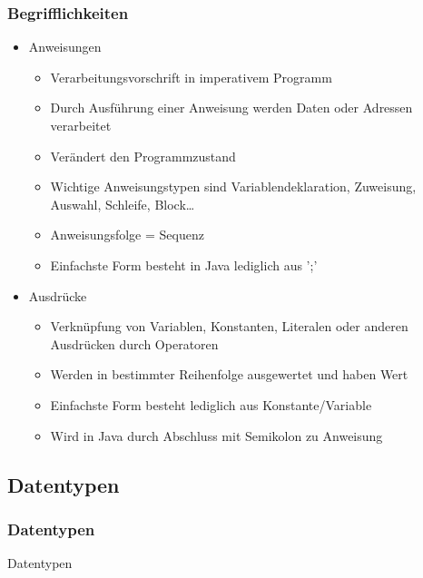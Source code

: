 \begin{frame}[fragile]
	\frametitle{Begrifflichkeiten}
	\begin{itemize}
	 \item Anweisungen
	  	\begin{itemize}
			\item Verarbeitungsvorschrift in imperativem Programm
			\item Durch Ausführung einer Anweisung werden Daten oder Adressen verarbeitet
			\item Verändert den Programmzustand
			\item Wichtige Anweisungstypen sind Variablendeklaration, Zuweisung,
			Auswahl, Schleife, Block\ldots
			\item Anweisungsfolge = Sequenz
			\item Einfachste Form besteht in Java lediglich aus ';'
	    \end{itemize}
	  \item Ausdrücke
	  	\begin{itemize}
			\item Verknüpfung von Variablen, Konstanten, Literalen oder anderen
			Ausdrücken durch Operatoren
			\item Werden in bestimmter Reihenfolge ausgewertet und haben Wert
			\item Einfachste Form besteht lediglich aus Konstante/Variable
			\item Wird in Java durch Abschluss mit Semikolon zu Anweisung 
	    \end{itemize}
	 \end{itemize}
\end{frame}

\subsection{Datentypen}
\begin{frame}[fragile]
	\frametitle{Datentypen}
	\huge Datentypen
\end{frame}

